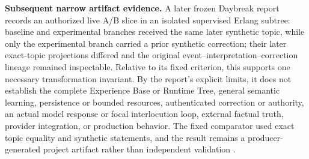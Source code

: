 \documentclass[10pt,a4paper]{article}
\begin{document}
\noindent\textbf{Subsequent narrow artifact evidence.} A later frozen Daybreak report records an authorized live A/B slice in an isolated supervised Erlang subtree: baseline and experimental branches received the same later synthetic topic, while only the experimental branch carried a prior synthetic correction; their later exact-topic projections differed and the original event--interpretation--correction lineage remained inspectable. Relative to its fixed criterion, this supports one necessary transformation invariant. By the report's explicit limits, it does not establish the complete Experience Base or Runtime Tree, general semantic learning, persistence or bounded resources, authenticated correction or authority, an actual model response or focal interlocution loop, external factual truth, provider integration, or production behavior. The fixed comparator used exact topic equality and synthetic statements, and the result remains a producer-generated project artifact rather than independent validation \cite{liveexperiencereport}.
\end{document}
